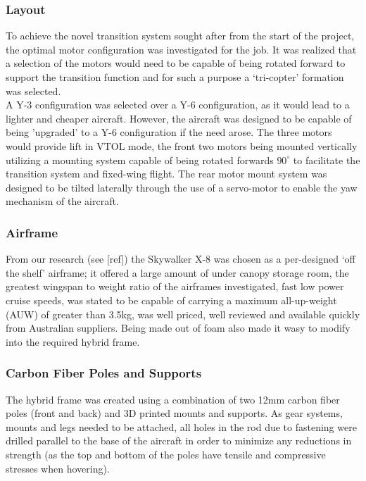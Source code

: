 \subsubsection*{Layout}
To achieve the novel transition system sought after from the start of the project, the optimal motor configuration was investigated for the job. It was realized that a selection of the motors would need to be capable of being rotated forward to support the transition function and for such a purpose a `tri-copter' formation was selected.\\
		
A Y-3 configuration was selected over a Y-6 configuration, as it would lead to a lighter and cheaper aircraft. However, the aircraft was designed to be capable of being 'upgraded' to a Y-6 configuration if the need arose. The three motors would provide lift in VTOL mode, the front two motors being mounted vertically utilizing a mounting system capable of being rotated forwards $90^{\circ}$ to facilitate the transition system and fixed-wing flight. The rear motor mount system was designed to be tilted laterally through the use of a servo-motor to enable the yaw mechanism of the aircraft.

\subsubsection*{Airframe}
From our research (see [ref]) the Skywalker X-8 was chosen as a per-designed `off the shelf' airframe; it offered a large amount of under canopy storage room, the greatest wingspan to weight ratio of the airframes investigated, fast low power cruise speeds, was stated to be capable of carrying a maximum all-up-weight (AUW) of greater than 3.5kg, was well priced, well reviewed and available quickly from Australian suppliers. Being made out of foam also made it wasy to modify into the required hybrid frame.
		
		
\subsubsection*{Carbon Fiber Poles and Supports}
The hybrid frame was created using a combination of two 12mm carbon fiber poles (front and back) and 3D printed mounts and supports. As gear systems, mounts and legs needed to be attached, all holes in the rod due to fastening were drilled parallel to the base of the aircraft in order to minimize any reductions in strength (as the top and bottom of the poles have tensile and compressive stresses when hovering).
	
